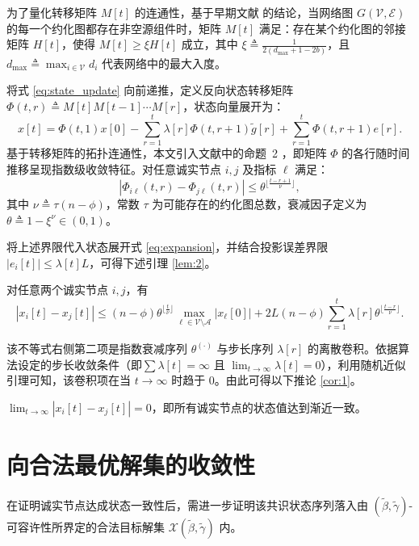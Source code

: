 为了量化转移矩阵 $M[t]$ 的连通性，基于早期文献  的结论，当网络图 $G(\mathcal{V}, \mathcal{E})$ 的每一个约化图都存在非空源组件时，矩阵 $M[t]$ 满足：存在某个约化图的邻接矩阵 $H[t]$，使得 $M[t] \ge \xi H[t]$ 成立，其中 $\xi \triangleq \frac{1}{2(d_{\max} + 1 - 2b)}$，且 $d_{\max} \triangleq \max_{i \in \mathcal{V}}d_i$ 代表网络中的最大入度。

将式 \eqref{eq:state_update} 向前递推，定义反向状态转移矩阵 $\Phi(t, r) \triangleq M[t]M[t-1] \cdots M[r]$，状态向量展开为：
\begin{equation} \label{eq:expansion}
    x[t] = \Phi(t, 1)x[0] - \sum_{r=1}^t \lambda[r]\Phi(t, r+1)\tilde{g}[r] + \sum_{r=1}^t \Phi(t, r+1)e[r].
\end{equation}
基于转移矩阵的拓扑连通性，本文引入文献中的命题~2 ，即矩阵 $\Phi$ 的各行随时间推移呈现指数级收敛特征。对任意诚实节点 $i, j$ 及指标 $\ell$ 满足：
\begin{equation}
    |\Phi_{i\ell}(t, r) - \Phi_{j\ell}(t, r)| \le \theta^{\lfloor \frac{t-r+1}{\nu} \rfloor},
\end{equation}
其中 $\nu \triangleq \tau(n-\phi)$，常数 $\tau$ 为可能存在的约化图总数，衰减因子定义为 $\theta \triangleq 1 - \xi^\nu \in (0, 1)$。

将上述界限代入状态展开式 \eqref{eq:expansion}，并结合投影误差界限 $|e_i[t]| \le \lambda[t]L$，可得下述引理 \ref{lem:2}。

\begin{lemma}\label{lem:2}
    对任意两个诚实节点 $i, j$，有
    \begin{equation}
        |x_i[t] - x_j[t]| \le (n - \phi)\theta^{\lfloor \frac{t}{\nu} \rfloor} \max_{\ell \in \mathcal{V}\setminus\mathcal{A}}|x_\ell[0]| + 2L(n - \phi)\sum_{r=1}^t \lambda[r]\theta^{\lfloor \frac{t-r}{\nu} \rfloor}.
    \end{equation}
\end{lemma}

该不等式右侧第二项是指数衰减序列 $\theta^{(\cdot)}$ 与步长序列 $\lambda[r]$ 的离散卷积。依据算法设定的步长收敛条件（即$\sum \lambda[t] = \infty$ 且 $\lim_{t \to \infty}\lambda[t] = 0$），利用随机近似引理可知，该卷积项在当 $t \to \infty$ 时趋于 $0$。由此可得以下推论 \ref{cor:1}。

\begin{corollary}\label{cor:1}
    $\lim_{t \to \infty} |x_i[t] - x_j[t]| = 0$，即所有诚实节点的状态值达到渐近一致。
\end{corollary}

\section{向合法最优解集的收敛性}
在证明诚实节点达成状态一致性后，需进一步证明该共识状态序列落入由 $(\tilde{\beta}, \tilde{\gamma})$-可容许性所界定的合法目标解集 $\mathcal{X}(\tilde{\beta}, \tilde{\gamma})$ 内。

